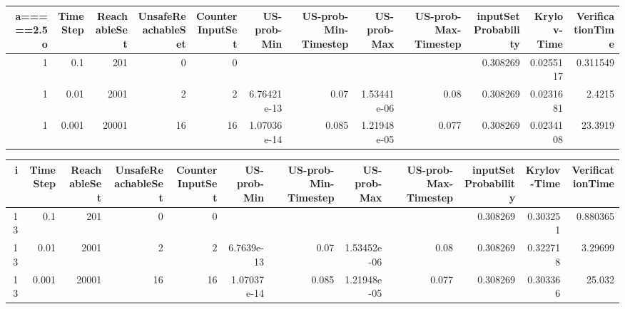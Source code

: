 \begin{tabular}{rrrrrrrrrrrr}
\hline a=====2.5
   o &   TimeStep &   ReachableSet &   UnsafeReachableSet &   CounterInputSet &   US-prob-Min &   US-prob-Min-Timestep &   US-prob-Max &   US-prob-Max-Timestep &   inputSet Probability &   Krylov-Time &   VerificationTime \\
\hline
   1 &      0.1   &            201 &                    0 &                 0 &               &                        &               &                        &               0.308269 &     0.0255117 &           0.311549 \\
   1 &      0.01  &           2001 &                    2 &                 2 &   6.76421e-13 &                  0.07  &   1.53441e-06 &                  0.08  &               0.308269 &     0.0231681 &           2.4215   \\
   1 &      0.001 &          20001 &                   16 &                16 &   1.07036e-14 &                  0.085 &   1.21948e-05 &                  0.077 &               0.308269 &     0.0234108 &          23.3919   \\
\hline
\end{tabular}
\begin{tabular}{rrrrrrrrrrrr}
\hline
   i &   TimeStep &   ReachableSet &   UnsafeReachableSet &   CounterInputSet &   US-prob-Min &   US-prob-Min-Timestep &   US-prob-Max &   US-prob-Max-Timestep &   inputSet Probability &   Krylov-Time &   VerificationTime \\
\hline
  13 &      0.1   &            201 &                    0 &                 0 &               &                        &               &                        &               0.308269 &      0.303251 &           0.880365 \\
  13 &      0.01  &           2001 &                    2 &                 2 &   6.7639e-13  &                  0.07  &   1.53452e-06 &                  0.08  &               0.308269 &      0.322718 &           3.29699  \\
  13 &      0.001 &          20001 &                   16 &                16 &   1.07037e-14 &                  0.085 &   1.21948e-05 &                  0.077 &               0.308269 &      0.303366 &          25.032    \\
\hline
\end{tabular}


